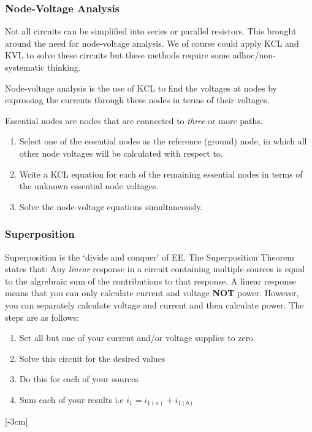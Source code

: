 \documentclass[12pt]{article}
\begin{document}
\subsubsection{Node-Voltage Analysis}
Not all circuits can be simplified into series or parallel resistors.
This brought around the need for node-voltage analysis.
We of course could apply KCL and KVL to solve these circuits but these methods require some adhoc/non-systematic thinking.

Node-voltage analysis is the use of KCL to find the voltages at nodes by expressing the currents through these nodes in terms of their voltages. 

Essential nodes are nodes that are connected to \textit{three} or more paths. 

\begin{enumerate}
  \item Select one of the essential nodes as the reference (ground) node, in which all other node voltages will be calculated with respect to.
  \item Write a KCL equation for each of the remaining essential nodes in terms of the unknown essential node voltages.
  \item Solve the node-voltage equations simultaneously.
\end{enumerate}

\subsubsection{Superposition}
Superposition is the `divide and conquer' of EE. 
The Superposition Theorem states that: Any \textit{linear} response in a circuit containing multiple sources is equal to the algrebraic sum of the contributions to that response.
A linear response means that you can only calculate current and voltage \textbf{NOT} power.
However, you can separately calculate voltage and current and then calculate power. 
The steps are as follows:

\begin{enumerate}
  \item Set all but one of your current and/or voltage supplies to zero
  \item Solve this circuit for the desired values 
  \item Do this for each of your sources
  \item Sum each of your results i.e $i_1=i_{1(a)}+i_{1(b)}$
\end{enumerate}
[-3cm]
\end{document}
